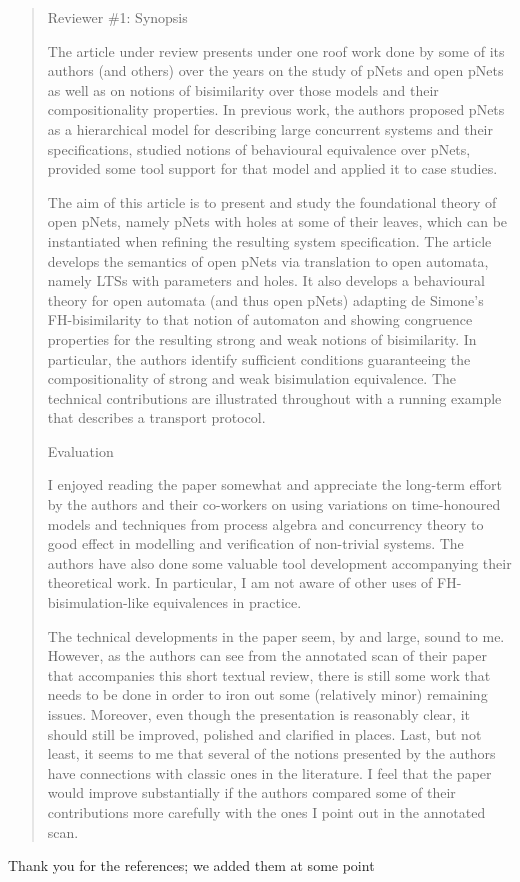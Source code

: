 \documentclass[10pt]{article}
\newenvironment{review}{\bgroup\itshape\begin{quote}}{\end{quote}\egroup}
\begin{document}
\begin{review}
Reviewer \#1: Synopsis

The article under review presents under one roof work done by some of its authors (and others) over the years on the study of pNets and open pNets as well as on notions of bisimilarity over those models and their compositionality properties. In previous work, the authors proposed pNets as a hierarchical model for describing large concurrent systems and their specifications, studied notions of behavioural equivalence over pNets, provided some tool support for that model and applied it to case studies.

The aim of this article is to present and study the foundational theory of open pNets, namely pNets with holes at some of their leaves, which can be instantiated when refining the resulting system specification. The article develops the semantics of open pNets via translation to open automata, namely LTSs with parameters and holes. It also develops a behavioural theory for open automata (and thus open pNets) adapting de Simone's FH-bisimilarity to that notion of automaton and showing congruence properties for the resulting strong and weak notions of bisimilarity. In particular, the authors identify sufficient conditions guaranteeing the compositionality of strong and weak bisimulation equivalence. The technical contributions are illustrated throughout with a running example that describes a transport protocol.

Evaluation

I enjoyed reading the paper somewhat and appreciate the long-term effort by the authors and their co-workers on using variations on time-honoured models and techniques from process algebra and concurrency theory to good effect in modelling and verification of non-trivial systems. The authors have also done some valuable tool development accompanying their theoretical work. In particular, I am not aware of other uses of FH-bisimulation-like equivalences in practice.

The technical developments in the paper seem, by and large, sound to me. However, as the authors can see from the annotated scan of their paper that accompanies this short textual review, there is still some work that needs to be done in order to iron out some (relatively minor) remaining issues. Moreover, even though the presentation is reasonably clear, it should still be improved, polished and clarified in places. Last, but not least, it seems to me that several of the notions presented by the authors have connections with classic ones in the literature. I feel that the paper would improve substantially if the authors compared some of their contributions more carefully with the ones I point out in the annotated scan. 
\end{review}
Thank you for the references;  we added  them at some point
\end{document}
